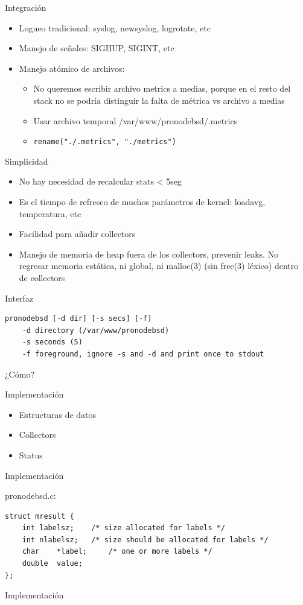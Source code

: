 \documentclass[11pt,spanish]{article}
\newcommand{\rowsp}[1][1em]{\vspace{#1}}
\newcommand{\hone}[1]{{\rowsp[0.3em]\noindent\Large #1 \rowsp[0.3em]}}
\newcommand{\htwo}[1]{{\rowsp\noindent\large #1 \rowsp}}
\newcommand{\myitm}[1]{\begin{itemize}#1\end{itemize}}
\begin{document}
\newpage %
\hone{Integración}

\myitm{
\item Logueo tradicional: syslog, newsyslog, logrotate, etc
\item Manejo de señales: SIGHUP, SIGINT, etc
\item Manejo atómico de archivos:
	\myitm{
	\item No queremos escribir archivo metrics a medias, porque
		en el resto del stack no se podría distinguir la falta
		de métrica vs archivo a medias
	\item Usar archivo temporal /var/www/pronodebsd/.metrics
	\item \lstinline|rename("./.metrics", "./metrics")|
	}
}

\newpage %
\hone{Simplicidad}

\myitm{
\item No hay necesidad de recalcular stats < 5seg
\item Es el tiempo de refresco de muchos parámetros de kernel: loadavg,
	temperatura, etc
\item Facilidad para añadir collectors
\item Manejo de memoria de heap fuera de los collectors, prevenir leaks.
	No regresar memoria estática, ni global, ni malloc(3) (sin free(3)
	léxico) dentro de collectors
}

\newpage %
\hone{Interfaz}

\begin{lstlisting}
pronodebsd [-d dir] [-s secs] [-f]
	-d directory (/var/www/pronodebsd)
	-s seconds (5)
	-f foreground, ignore -s and -d and print once to stdout
\end{lstlisting}

\newpage %
\hone{¿Cómo?}

\htwo{Implementación}

\myitm{
\item Estructuras de datos
\item Collectors
\item Status
}

\newpage %
\hone{Implementación}

pronodebsd.c:
\begin{lstlisting}
struct mresult {
	int	labelsz;	/* size allocated for labels */
	int	nlabelsz;	/* size should be allocated for labels */
	char	*label;		/* one or more labels */
	double	value;
};
\end{lstlisting}
\newpage %
\hone{Implementación}
\end{document}
